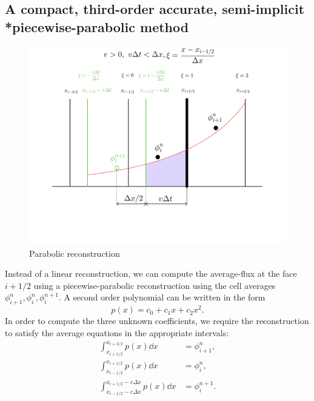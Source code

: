 \documentclass[../thesis.tex]{subfiles}
\begin{document}
\subsection[]{A compact, third-order accurate, semi-implicit \\*piecewise-parabolic method}
\begin{figure}[H]
	\centering
	\includegraphics[width=\textwidth]{implicit-ppm-crop.pdf}
	\caption{Parabolic reconstruction}
	\label{fig:implicit-ppm}
\end{figure}
Instead of a linear reconstruction,
we can compute the average-flux at the face \(i+1/2\) using a piecewise-parabolic reconstruction using the cell averages \(\phi_{i+1}^{n}, \phi_{i}^{n}, \phi_{i}^{n+1}\). A second order polynomial can be written in the form
\begin{equation}
    p(x) = c_0 + c_1 x + c_2 x^2.
\end{equation}
In order to compute the three unknown coefficients, we require the reconstruction to satisfy the average equations in the appropriate intervals:
\begin{equation}
    \begin{split}
        \int_{x_{i+1/2}}^{x_{i+3/2}} p(x) \dd{x}
        &= \phi_{i+1}^{n},
        \\
        \int_{x_{i-1/2}}^{x_{i+1/2}} p(x) \dd{x}
        &= \phi_{i}^{n},
        \\
        \int_{x_{i-1/2} - c\Delta x}^{x_{i+1/2} - c\Delta x} p(x) \dd{x}
        &= \phi_{i}^{n+1}.
    \end{split}
\end{equation}
\end{document}
